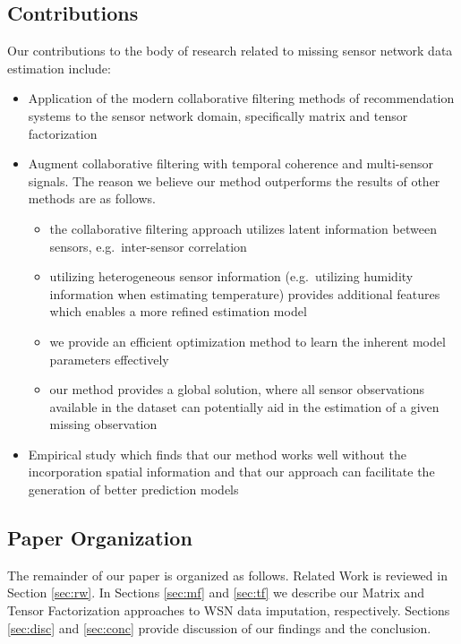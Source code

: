 \subsection{Contributions }
Our contributions to the body of research related to missing sensor network data estimation include:
\begin{itemize}
\item Application of the modern collaborative filtering methods of recommendation systems to the sensor network domain, specifically matrix and tensor factorization
\item Augment collaborative filtering with temporal coherence and multi-sensor signals. The reason we believe our method outperforms the results of other methods are as follows.
\begin{itemize}
\item the collaborative filtering approach utilizes latent information between sensors, e.g.\ inter-sensor correlation
\item utilizing heterogeneous sensor information (e.g.\ utilizing humidity information when estimating temperature) provides additional features which enables a more refined estimation model
\item we provide an efficient optimization method to learn the inherent model parameters effectively
\item our method provides a global solution, where all sensor observations available in the dataset can potentially aid in the estimation of a given missing observation
\end{itemize}
\item Empirical study which finds that our method works well without the incorporation spatial information and that our approach can facilitate the generation of better prediction models
\end{itemize}

\subsection{Paper Organization }
The remainder of our paper is organized as follows.
Related Work is reviewed in Section \ref{sec:rw}.
In Sections \ref{sec:mf} and \ref{sec:tf} we describe our Matrix and Tensor Factorization approaches to WSN data imputation, respectively.
Sections \ref{sec:disc} and \ref{sec:conc} provide discussion of our findings and the conclusion.
